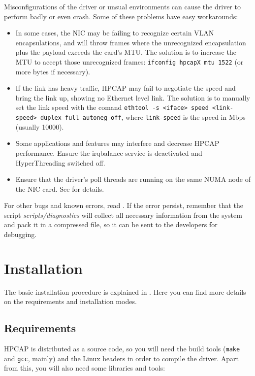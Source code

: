 \documentclass[a4paper,oneside]{hpman}
\begin{document}
Misconfigurations of the driver or unsual environments can cause the driver to perform badly or even crash. Some of these problems have easy workarounds:
\begin{itemize}
\item In some cases, the NIC may be failing to recognize certain VLAN encapsulations, and will throw frames where the unrecognized encapsulation plus the payload exceeds the card's MTU. The solution is to increase the MTU to accept those unrecognized frames: \texttt{ifconfig hpcapX mtu 1522} (or more bytes if necessary).
\item If the link has heavy traffic, HPCAP may fail to negotiate the speed and bring the link up, showing no Ethernet level link. The solution is to manually set the link speed with the comand \texttt{ethtool -s <iface> speed <link-speed> duplex full autoneg off}, where \texttt{link-speed} is the speed in Mbps (usually 10000).
\item Some applications and features may interfere and decrease HPCAP performance. Ensure the irqbalance service is deactivated and HyperThreading switched off.
\item Ensure that the driver's poll threads are running on the same NUMA node of the NIC card. See  for details.
\end{itemize}

For other bugs and known errors, read . If the error persist, remember that the script \textit{scripts/diagnostics} will collect all necessary information from the system and pack it in a compressed file, so it can be sent to the developers for debugging.

\chapter{Installation}
\label{sec:Installation}

The basic installation procedure is explained in . Here you can find more details on the requirements and installation modes.

\section{Requirements}

HPCAP is distributed as a source code, so you will need the build tools (\texttt{make} and \texttt{gcc}, mainly) and the Linux headers in order to compile the driver. Apart from this, you will also need some libraries and tools:
\end{document}
